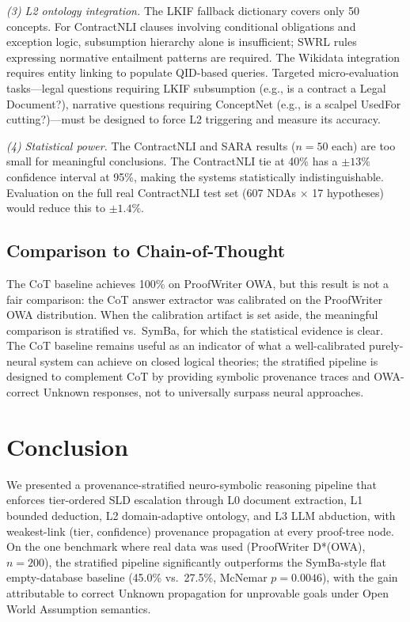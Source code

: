 \documentclass[11pt,letterpaper]{article}
\begin{document}
\textit{(3) L2 ontology integration.} The LKIF fallback dictionary covers only 50 concepts. For ContractNLI
clauses involving conditional obligations and exception logic, subsumption hierarchy alone is insufficient; SWRL rules
expressing normative entailment patterns are required. The Wikidata integration requires entity linking to populate QID-based
queries. Targeted micro-evaluation tasks---legal questions requiring LKIF subsumption (e.g., is a contract a Legal Document?),
narrative questions requiring ConceptNet (e.g., is a scalpel UsedFor cutting?)---must be designed to force L2 triggering
and measure its accuracy.

\textit{(4) Statistical power.} The ContractNLI and SARA results ($n = 50$ each) are too small for
meaningful conclusions. The ContractNLI tie at 40\% has a $\pm13\%$ confidence interval at 95\%, making the systems statistically
indistinguishable. Evaluation on the full real ContractNLI test set (607 NDAs $\times$ 17 hypotheses) would reduce this
to $\pm1.4\%$.

\subsection{Comparison to Chain-of-Thought}

The CoT baseline achieves 100\% on ProofWriter OWA, but this
result is not a fair comparison: the CoT answer extractor was calibrated on the ProofWriter OWA distribution. When the
calibration artifact is set aside, the meaningful comparison is stratified vs.\ SymBa, for which the statistical evidence
is clear. The CoT baseline remains useful as an indicator of what a well-calibrated purely-neural system can achieve on
closed logical theories; the stratified pipeline is designed to complement CoT by providing symbolic provenance traces
and OWA-correct Unknown responses, not to universally surpass neural approaches.

\section{Conclusion}

We presented a provenance-stratified neuro-symbolic reasoning pipeline that enforces tier-ordered SLD escalation through L0 document extraction, L1 bounded deduction, L2 domain-adaptive ontology, and L3 LLM abduction, with weakest-link (tier, confidence) provenance propagation at every proof-tree node. On the one benchmark where real data was used (ProofWriter D*(OWA), $n = 200$), the stratified pipeline significantly outperforms the SymBa-style flat empty-database baseline (45.0\% vs.\ 27.5\%, McNemar $p = 0.0046$), with the gain attributable to correct Unknown propagation for unprovable goals under Open World Assumption semantics.
\end{document}
